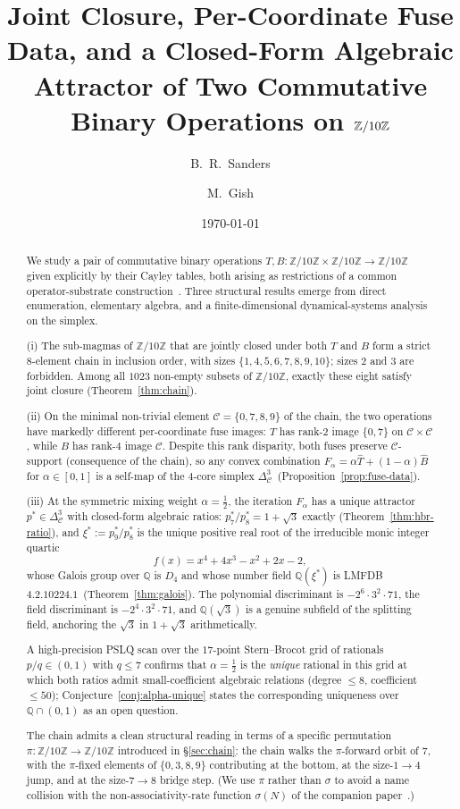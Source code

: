 \documentclass[11pt,reqno]{amsart}
\title[Joint closure on $\Zten$]{Joint Closure, Per-Coordinate Fuse
Data, and a Closed-Form Algebraic Attractor of Two Commutative Binary
Operations on $\Zten$}
\author{B.~R.~Sanders}
\author{M.~Gish}
\date{\today}
\theoremstyle{plain}
\theoremstyle{definition}
\theoremstyle{remark}
\newcommand{\Z}{\mathbb{Z}}
\newcommand{\Q}{\mathbb{Q}}
\newcommand{\Zten}{\Z/10\Z}
\newcommand{\Cfour}{\mathcal{C}}
\newcommand{\Tfuse}{\widehat{T}}
\newcommand{\Bfuse}{\widehat{B}}
\begin{document}
\begin{abstract}
We study a pair of commutative binary operations
$T,B:\Zten\times\Zten\to\Zten$ given explicitly by their Cayley
tables, both arising as restrictions of a common operator-substrate
construction~\cite{SandersGish2026Sigma}. Three structural results
emerge from direct enumeration, elementary algebra, and a
finite-dimensional dynamical-systems analysis on the simplex.

(i) The sub-magmas of $\Zten$ that are jointly closed under both
$T$ and $B$ form a strict $8$-element chain in inclusion order,
with sizes $\{1, 4, 5, 6, 7, 8, 9, 10\}$; sizes $2$ and $3$ are
forbidden. Among all $1023$ non-empty subsets of $\Zten$, exactly
these eight satisfy joint closure (Theorem~\ref{thm:chain}).

(ii) On the minimal non-trivial element $\Cfour=\{0,7,8,9\}$ of
the chain, the two operations have markedly different
per-coordinate fuse images: $T$ has rank-$2$ image $\{0, 7\}$ on
$\Cfour\times\Cfour$, while $B$ has rank-$4$ image $\Cfour$.
Despite this rank disparity, both fuses preserve $\Cfour$-support
(consequence of the chain), so any convex combination
$F_\alpha = \alpha\Tfuse + (1-\alpha)\Bfuse$ for $\alpha\in[0,1]$
is a self-map of the $4$-core simplex
$\Delta^{3}_{\Cfour}$~(Proposition~\ref{prop:fuse-data}).

(iii) At the symmetric mixing weight $\alpha=\tfrac12$, the
iteration $F_\alpha$ has a unique attractor
$p^*\in\Delta^{3}_{\Cfour}$ with closed-form algebraic ratios:
$p^*_{7}/p^*_{8}=1+\sqrt{3}$ exactly
(Theorem~\ref{thm:hbr-ratio}), and $\xi^*:=p^*_{9}/p^*_{8}$ is
the unique positive real root of the irreducible monic integer
quartic
\[
  f(x) = x^{4}+4x^{3}-x^{2}+2x-2,
\]
whose Galois group over $\Q$ is $D_{4}$ and whose number field
$\Q(\xi^*)$ is LMFDB~$4.2.10224.1$~(Theorem~\ref{thm:galois}).
The polynomial discriminant is
$-2^{6}\cdot 3^{2}\cdot 71$, the field discriminant is
$-2^{4}\cdot 3^{2}\cdot 71$, and $\Q(\sqrt{3})$ is a genuine
subfield of the splitting field, anchoring the $\sqrt{3}$ in
$1+\sqrt{3}$ arithmetically.

A high-precision PSLQ scan over the $17$-point Stern--Brocot grid
of rationals $p/q\in(0,1)$ with $q\le 7$ confirms that
$\alpha=\tfrac12$ is the \emph{unique} rational in this grid at
which both ratios admit small-coefficient algebraic relations
(degree $\le 8$, coefficient $\le 50$);
Conjecture~\ref{conj:alpha-unique} states the corresponding
uniqueness over $\Q\cap(0,1)$ as an open question.

The chain admits a clean structural reading in terms of a
specific permutation $\pi:\Zten\to\Zten$ introduced in
\S\ref{sec:chain}: the chain walks the $\pi$-forward orbit of
$7$, with the $\pi$-fixed elements of $\{0,3,8,9\}$ contributing
at the bottom, at the size-$1\to 4$ jump, and at the size-$7\to 8$
bridge step. (We use $\pi$ rather than $\sigma$ to avoid a name
collision with the non-associativity-rate function $\sigma(N)$
of the companion paper~\cite{SandersGish2026Sigma}.)
\end{abstract}
\end{document}
